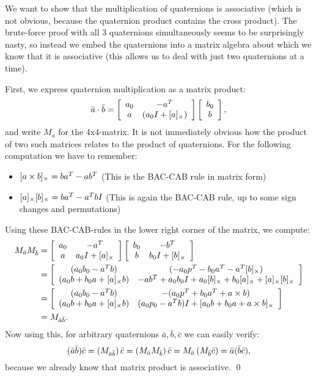 \documentclass{scrartcl}
\begin{document}
 We want to show that the multiplication of 
quaternions is associative (which is not obvious, because the quaternion product contains the cross product).
The brute-force proof with all $3$ quaternions simultaneously 
seems to be surprisingly nasty, so instead we embed the 
quaternions into a matrix algebra about which we know that it is 
associative (this allows us to deal with just two quaternions at a time).

First, we express quaternion multiplication as a matrix product:
\[
  \bar a \cdot \bar b = \mat{cc}{
    a_0 & -a^T \\
    a   & (a_0 I + [a]_\cross)
  }
  \mat{c}{b_0 \\ b},
\]
and write $M_{\bar a}$ for the 4x4-matrix.
It is not immediately obvious how the product of two such matrices relates to the product of quaternions. For the following 
computation we have to remember:
\begin{itemize}
  \item $[a \cross b]_\cross = b a^T - a b^T$ (This is the BAC-CAB rule in matrix form)
  \item $[a]_\cross [b]_\cross = b a^T - a^T b I$ (This is again the
  BAC-CAB rule, up to some sign changes and permutations)
\end{itemize} 
Using these BAC-CAB-rules in the lower right corner of the matrix, we compute:
\begin{align*}
  M_{\bar a} M_{\bar b}
    &= \mat{cc}{
      a_0 & -a^T \\
      a   & a_0 I + [a]_\cross
    }
    \mat{cc}{
      b_0 & -b^T \\
      b   & b_0 I + [b]_\cross
    } \\
    &= \mat{cc}{
      (a_0 b_0 - a^T b) & (-a_0 p^T - b_0 a^T - a^T [b]_\cross) \\
      (a_0 b + b_0 a + [a]_\cross b) &
        -a b^T + a_0 b_0 I + a_0 [b]_\cross + b_0 [a]_\cross + 
        [a]_\cross [b]_\cross
    } \\
    &= \mat{cc} {
      (a_0 b_0 - a^T b) & -(a_0 p^T + b_0 a^T + a \cross b) \\
      (a_0 b + b_0 a + [a]_\cross b) &
        (a_0 p_0 - a^T b)I + [a_0 b + b_0 a + a\cross b]_\cross
    } \\
    &= M_{\bar a \bar b}.
\end{align*}
Now using this, 
for arbitrary quaternions $\bar a, \bar b, \bar c$ we can 
easily verify:
\[
  (\bar a \bar b) \bar c = 
  \rPar{M_{\bar a \bar b}}\bar c =
  \rPar{M_{\bar a} M_{\bar b}} \bar c = 
  M_{\bar a} \rPar{M_{\bar b} \bar c} =
  \bar a (\bar b \bar c),
\]
because we already know that matrix product is associative.
\hfill \qed
\end{document}
